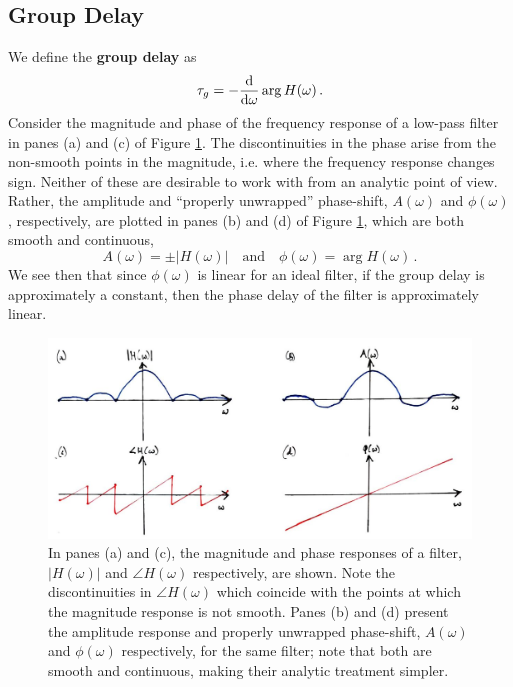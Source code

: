 \subsection{Group Delay}
%
We define the \textbf{group delay} as
%
\begin{displaymath}
  \tau_g = -\frac{\mathrm{d}}{\mathrm{d\omega}} \arg H(\omega) \,.
\end{displaymath}
%
Consider the magnitude and phase of the frequency response of a
low-pass filter in panes (a) and (c) of Figure
\ref{fig::lecture_16_amplitude_response}. The discontinuities in the phase 
arise from the non-smooth points in the magnitude, i.e. where the frequency
response changes sign. Neither of these are desirable to work with from
an analytic point of view. Rather, the amplitude and ``properly unwrapped''
phase-shift, $A(\omega)$ and $\phi(\omega)$, respectively, are plotted in
panes (b) and (d) of Figure \ref{fig::lecture_16_amplitude_response},
which are both smooth and continuous,
%
\begin{displaymath}
  A(\omega) = \pm |H(\omega)| \quad\mathrm{and}\quad
  \phi(\omega) = \arg H(\omega) \,.
\end{displaymath}
%
We see then that since $\phi(\omega)$ is linear for an ideal filter, if the
group delay is approximately a constant, then the phase delay of the filter
is approximately linear.
%
\begin{figure}[!htb]
  \includegraphics[width=\textwidth]{images/lecture_16_amplitude_response.JPG}
  \caption{In panes (a) and (c), the magnitude and phase responses of a filter,
    $|H(\omega)|$ and $\angle H(\omega)$ respectively, are shown. Note the
    discontinuities in $\angle H(\omega)$ which coincide with the points
    at which the magnitude response is not smooth. Panes (b) and (d) present
    the amplitude response and properly unwrapped phase-shift, $A(\omega)$ and
    $\phi(\omega)$ respectively, for the same filter; note that both are
    smooth and continuous, making their analytic treatment simpler.
  }
  \label{fig::lecture_16_amplitude_response}
\end{figure}

